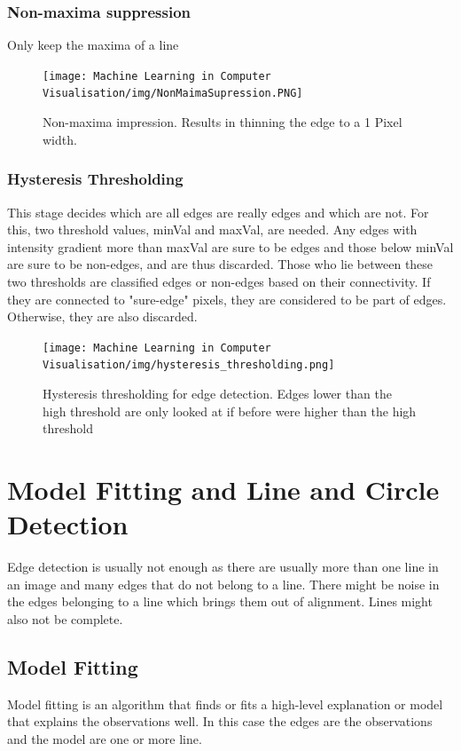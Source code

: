 \documentclass[x11names,11pt,a4paper]{article}
\theoremstyle{definition}
\begin{document}
\subsubsection{Non-maxima suppression}
Only keep the maxima of a line
\begin{figure}[H]
	\centering
	\texttt{[image: Machine Learning in Computer Visualisation/img/NonMaimaSupression.PNG]}
	\caption{Non-maxima impression. Results in thinning the edge to a 1 Pixel width.}
\end{figure}

\subsubsection{Hysteresis Thresholding}
This stage decides which are all edges are really edges and which are not. For this, two threshold values, minVal and maxVal, are needed. Any edges with intensity gradient more than maxVal are sure to be edges and those below minVal are sure to be non-edges, and are thus discarded. Those who lie between these two thresholds are classified edges or non-edges based on their connectivity. If they are connected to "sure-edge" pixels, they are considered to be part of edges. Otherwise, they are also discarded.
	
\begin{figure}[H]
	\centering
	\texttt{[image: Machine Learning in Computer Visualisation/img/hysteresis\_thresholding.png]}
	\caption{Hysteresis thresholding for edge detection. Edges lower than the high threshold are only looked at if before were higher than the high threshold}
\end{figure}

\section{Model Fitting and Line and Circle Detection}
Edge detection is usually not enough as there are usually more than one line in an image and many edges that do not belong to a line. There might be noise in the edges belonging to a line which brings them out of alignment. Lines might also not be complete.

\subsection{Model Fitting}
Model fitting is an algorithm that finds or fits a high-level explanation or model that explains the observations well. In this case the edges are the observations and the model are one or more line.
\end{document}
